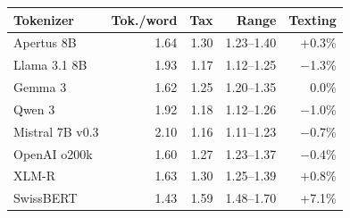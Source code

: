\begin{tabular}{lrrrr}
\toprule
Tokenizer & Tok./word & Tax & Range & Texting \\
\midrule
Apertus 8B & 1.64 & 1.30 & 1.23--1.40 & +0.3\% \\
Llama 3.1 8B & 1.93 & 1.17 & 1.12--1.25 & $-$1.3\% \\
Gemma 3 & 1.62 & 1.25 & 1.20--1.35 & 0.0\% \\
Qwen 3 & 1.92 & 1.18 & 1.12--1.26 & $-$1.0\% \\
Mistral 7B v0.3 & 2.10 & 1.16 & 1.11--1.23 & $-$0.7\% \\
OpenAI o200k & 1.60 & 1.27 & 1.23--1.37 & $-$0.4\% \\
XLM-R & 1.63 & 1.30 & 1.25--1.39 & +0.8\% \\
SwissBERT & 1.43 & 1.59 & 1.48--1.70 & +7.1\% \\
\bottomrule
\end{tabular}
